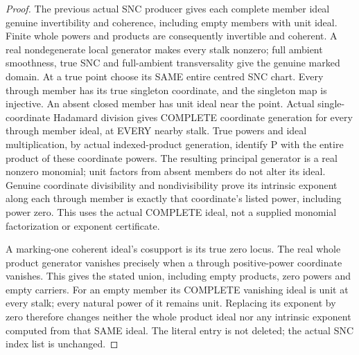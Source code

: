 \begin{proof}
The previous actual SNC producer gives each complete member ideal genuine
invertibility and coherence, including empty members with unit ideal. Finite
whole powers and products are consequently invertible and coherent. A real
nondegenerate local generator makes every stalk nonzero; full ambient
smoothness, true SNC and full-ambient transversality give the genuine marked
domain. At a true point choose its SAME entire centred SNC chart. Every
through member has its true singleton coordinate, and the singleton map is
injective. An absent closed member has unit ideal near the point. Actual
single-coordinate Hadamard division gives COMPLETE coordinate generation
for every through member ideal, at EVERY nearby stalk. True powers and ideal
multiplication, by actual indexed-product generation, identify P with the
entire product of these coordinate powers. The resulting principal generator
is a real nonzero monomial; unit factors from absent members do not alter
its ideal. Genuine coordinate divisibility and nondivisibility prove its
intrinsic exponent along each through member is exactly that coordinate's
listed power, including power zero. This uses the actual COMPLETE ideal,
not a supplied monomial factorization or exponent certificate.

A marking-one coherent ideal's cosupport is its true zero locus. The real
whole product generator vanishes precisely when a through positive-power
coordinate vanishes. This gives the stated union, including empty products,
zero powers and empty carriers. For an empty member its COMPLETE vanishing
ideal is unit at every stalk; every natural power of it remains unit. Replacing
its exponent by zero therefore changes neither the whole product ideal nor
any intrinsic exponent computed from that SAME ideal. The literal entry is
not deleted; the actual SNC index list is unchanged.
\end{proof}

